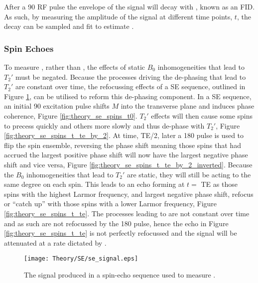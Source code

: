 After a 90\degree{ } \ac{RF} pulse the envelope of the signal will decay with \ttwostar, known as an \ac{FID}. As such, by measuring the amplitude of the signal at different time points, $t$, the decay can be sampled and fit to estimate \ttwostar.\\

\subsubsection{Spin Echoes}
To measure \ttwo, rather than \ttwostar, the effects of static $B_0$ inhomogeneities that lead to $T_2'$ must be negated. Because the processes driving the de-phasing that lead to $T_2'$ are constant over time, the refocussing effects of a \ac{SE} sequence, outlined in Figure \ref{fig:theory_se_signal}, can be utilised to reform this de-phasing component. In a \ac{SE} sequence, an initial 90\degree{ } excitation pulse shifts $M$ into the transverse plane and induces phase coherence, Figure \ref{fig:theory_se_spins_t0}. $T_2'$ effects will then cause some spins to precess quickly and others more slowly and thus de-phase with $T_2'$, Figure \ref{fig:theory_se_spins_t_te_by_2}. At time, \ac{TE}/2, later a 180\degree{ } pulse is used to flip the spin ensemble, reversing the phase shift meaning those spins that had accrued the largest positive phase shift will now have the largest negative phase shift and vice versa, Figure \ref{fig:theory_se_spins_t_te_by_2_inverted}. Because the $B_0$ inhomogeneities that lead to $T_2'$ are static, they will still be acting to the same degree on each spin. This leads to an echo forming at $t =$ \ac{TE} as those spins with the highest Larmor frequency, and largest negative phase shift, refocus or ``catch up'' with those spins with a lower Larmor frequency, Figure \ref{fig:theory_se_spins_t_te}. The processes leading to \ttwo are not constant over time and as such are not refocussed by the 180\degree{ } pulse, hence the echo in Figure \ref{fig:theory_se_spins_t_te} is not perfectly refocussed and the signal will be attenuated at a rate dictated by \ttwo.

\begin{figure}[H]
	\centering
	\texttt{[image: Theory/SE/se\_signal.eps]}
	\caption{The signal produced in a spin-echo sequence used to measure \ttwo.}
	\label{fig:theory_se_signal}	
\end{figure}

